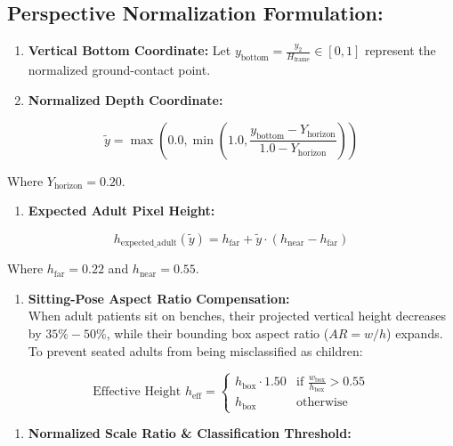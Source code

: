 \subsection{Perspective Normalization
Formulation:}\label{perspective-normalization-formulation}

\begin{enumerate}
\def\labelenumi{\arabic{enumi}.}
\tightlist
\item
  \textbf{Vertical Bottom Coordinate:} Let
  \(y_{\text{bottom}} = \frac{y_2}{H_{\text{frame}}} \in [0, 1]\)
  represent the normalized ground-contact point.
\item
  \textbf{Normalized Depth Coordinate:}
\end{enumerate}

\[\tilde{y} = \max\left( 0.0, \min\left( 1.0, \frac{y_{\text{bottom}} - Y_{\text{horizon}}}{1.0 - Y_{\text{horizon}}} \right) \right)\]

Where \(Y_{\text{horizon}} = 0.20\).

\begin{enumerate}
\def\labelenumi{\arabic{enumi}.}
\setcounter{enumi}{2}
\tightlist
\item
  \textbf{Expected Adult Pixel Height:}
\end{enumerate}

\[h_{\text{expected\_adult}}(\tilde{y}) = h_{\text{far}} + \tilde{y} \cdot (h_{\text{near}} - h_{\text{far}})\]

Where \(h_{\text{far}} = 0.22\) and \(h_{\text{near}} = 0.55\).

\begin{enumerate}
\def\labelenumi{\arabic{enumi}.}
\setcounter{enumi}{3}
\tightlist
\item
  \textbf{Sitting-Pose Aspect Ratio Compensation:}\\
  When adult patients sit on benches, their projected vertical height
  decreases by \(35\% - 50\%\), while their bounding box aspect ratio
  (\(AR = w / h\)) expands. To prevent seated adults from being
  misclassified as children:
\end{enumerate}

\[\text{Effective Height } h_{\text{eff}} = \begin{cases} h_{\text{box}} \cdot 1.50 & \text{if } \frac{w_{\text{box}}}{h_{\text{box}}} > 0.55 \\ h_{\text{box}} & \text{otherwise} \end{cases}\]

\begin{enumerate}
\def\labelenumi{\arabic{enumi}.}
\setcounter{enumi}{4}
\tightlist
\item
  \textbf{Normalized Scale Ratio \& Classification Threshold:}
\end{enumerate}

